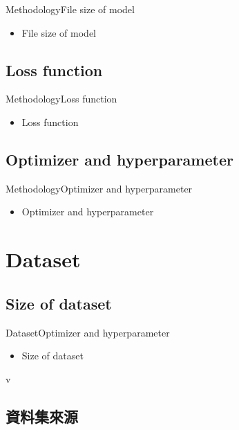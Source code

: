 \documentclass{beamer}
\begin{document}
\begin{CJK}{UTF8}{}
\begin{frame}{Methodology}{File size of model}
	\begin{itemize}
	\item{
		File size of model
	}
	\end{itemize}
\end{frame}

\subsection{Loss function}

\begin{frame}{Methodology}{Loss function}
	\begin{itemize}
	\item{
		Loss function
	}
	\end{itemize}
\end{frame}

\subsection{Optimizer and hyperparameter}

\begin{frame}{Methodology}{Optimizer and hyperparameter}
	\begin{itemize}
	\item{
		Optimizer and hyperparameter
	}
	\end{itemize}
\end{frame}

\section{Dataset}

\subsection{Size of dataset}

\begin{frame}{Dataset}{Optimizer and hyperparameter}
	\begin{itemize}
	\item{
		Size of dataset
	}
	\end{itemize}
\end{frame}v

\subsection{資料集來源}


\end{CJK}
\end{document}
